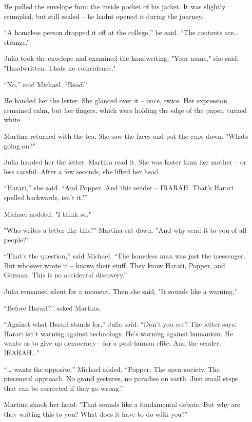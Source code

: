 \documentclass[
]{article}
\begin{document}
He pulled the envelope from the inside pocket of his jacket. It was slightly crumpled, but still sealed -- he hadn\textquotesingle t opened it during the journey.

``A homeless person dropped it off at the college,'' he said. ``The contents are\ldots{} strange.''

Julia took the envelope and examined the handwriting. "Your name," she said. "Handwritten. That\textquotesingle s no coincidence."

``No,'' said Michael. ``Read.''

He handed her the letter. She glanced over it -- once, twice. Her expression remained calm, but her fingers, which were holding the edge of the paper, turned white.

Martina returned with the tea. She saw the faces and put the cups down. "What\textquotesingle s going on?"

Julia handed her the letter. Martina read it. She was faster than her mother -- or less careful. After a few seconds, she lifted her head.

``Harari,'' she said. ``And Popper. And this sender -- IRARAH. That's Harari spelled backwards, isn't it?''

Michael nodded. "I think so."

"Who writes a letter like this?" Martina sat down. "And why send it to you of all people?"

``That's the question,'' said Michael. ``The homeless man was just the messenger. But whoever wrote it -- knows their stuff. They know Harari, Popper, and German. This is no accidental discovery.''

Julia remained silent for a moment. Then she said, "It sounds like a warning."

``Before Harari?'' asked Martina.

``Against what Harari stands for,'' Julia said. ``Don't you see? The letter says: Harari isn't warning against technology. He's warning against humanism. He wants us to give up democracy---for a post-human elite. And the sender, IRARAH\ldots''

``\ldots{} wants the opposite,'' Michael added. ``Popper. The open society. The piecemeal approach. No grand gestures, no paradise on earth. Just small steps that can be corrected if they go wrong.''

Martina shook her head. "That sounds like a fundamental debate. But why are they writing this to you? What does it have to do with you?"
\end{document}
